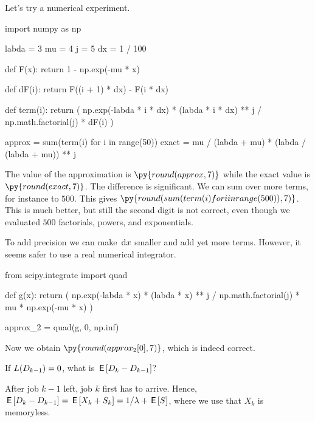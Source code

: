 Let's try a numerical experiment.
\begin{pyblock}
import numpy as np

labda = 3
mu = 4
j = 5
dx = 1 / 100


def F(x):
    return 1 - np.exp(-mu * x)


def dF(i):
    return F((i + 1) * dx) - F(i * dx)


def term(i):
    return (
        np.exp(-labda * i * dx)
        * (labda * i * dx) ** j
        / np.math.factorial(j)
        * dF(i)
    )


approx = sum(term(i) for i in range(50))
exact = mu / (labda + mu) * (labda / (labda + mu)) ** j
\end{pyblock}
The value of the approximation is $\py{round(approx, 7)}$ while the exact value is $\py{round(exact, 7)}$.
The difference is significant.
We can sum over more terms, for instance to $500$.
This gives $\py{round(sum(term(i) for i in range(500)),7)}$.
This is much better, but still the second digit is not correct, even though we evaluated $500$ factorials, powers, and exponentials.

To add precision we can make $\,\textrm{d}x$ smaller and add yet more terms.
However, it seems safer to use a real numerical integrator.
\begin{pyblock}
from scipy.integrate import quad

def g(x):
    return (
        np.exp(-labda * x)
        * (labda * x) ** j
        / np.math.factorial(j)
        * mu
        * np.exp(-mu * x)
    )

approx_2 = quad(g, 0, np.inf)
\end{pyblock}
Now we obtain $\py{round(approx_2[0], 7)}$, which is indeed correct.


\begin{exercise}\label{ex:17}
 If  $L(D_{k-1}) = 0$, what is $\,\mathsf{E}\left[D_{k}-D_{k-1}\right]$?
\begin{solution}
  After job $k-1$ left, job $k$ first has to arrive.
  Hence, $\,\mathsf{E}\left[D_k - D_{k-1}\right] = \,\mathsf{E}\left[X_k + S_k\right] = 1/\lambda + \,\mathsf{E}\left[S\right]$, where we use that $X_k$ is memoryless.
\end{solution}
\end{exercise}

